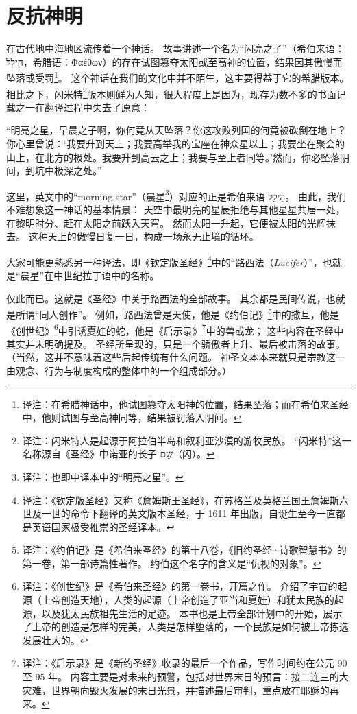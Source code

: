 \chapter{反抗神明}
在古代地中海地区流传着一个神话。
故事讲述一个名为“闪亮之子”（希伯来语：\texthebrew{הֵילֵל}，希腊语：\textgreek{Φαέθων}）的存在试图篡夺太阳或至高神的位置，结果因其傲慢而坠落或受罚\footnote{%
    译注：在希腊神话中，他试图篡夺太阳神的位置，结果坠落；而在希伯来圣经中，他则试图与至高神同等，结果被罚落入阴间。
}。
这个神话在我们的文化中并不陌生，这主要得益于它的希腊版本。
相比之下，闪米特\footnote{%
    译注：闪米特人是起源于阿拉伯半岛和叙利亚沙漠的游牧民族。
    “闪米特”这一名称源自《圣经》中诺亚的长子 \texthebrew{שֵׁם}（闪）。
}版本则鲜为人知，很大程度上是因为，现存为数不多的书面记载之一在翻译过程中失去了原意：

“明亮之星，早晨之子啊，你何竟从天坠落？你这攻败列国的何竟被砍倒在地上？你心里曾说：‘我要升到天上；我要高举我的宝座在神众星以上；我要坐在聚会的山上，在北方的极处。我要升到高云之上；我要与至上者同等。’然而，你必坠落阴间，到坑中极深之处。”\cite{biblica2011new-international-version}

这里，英文中的“morning star”（晨星\footnote{%
    译注：也即中译本中的“明亮之星”。
}）对应的正是希伯来语 \texthebrew{הֵילֵל}。
由此，我们不难想象这一神话的基本情景：
天空中最明亮的星辰拒绝与其他星星共居一处，在黎明时分、赶在太阳之前跃入天穹。
然而太阳一升起，它便被太阳的光辉抹去。
这种天上的傲慢日复一日，构成一场永无止境的循环。

大家可能更熟悉另一种译法，即《钦定版圣经》\footnote{%
    译注：《钦定版圣经》又称《詹姆斯王圣经》，在苏格兰及英格兰国王詹姆斯六世及一世的命令下翻译的英文版本圣经，于 1611 年出版，自诞生至今一直都是英语国家极受推崇的圣经译本。
}中的“路西法（\textlatin{\emph{Lucifer}}）”，也就是“晨星”在中世纪拉丁语中的名称。

仅此而已。这就是《圣经》中关于路西法的全部故事。
其余都是民间传说，也就是所谓“同人创作”。
例如，路西法曾是天使，他是《约伯记》\footnote{%
    译注：《约伯记》是《希伯来圣经》的第十八卷，《旧约圣经·诗歌智慧书》的第一卷，第一部诗篇性著作。
    约伯这个名字的含义是“仇视的对象”。
}中的撒旦，他是《创世纪》\footnote{%
    译注：《创世纪》是《希伯来圣经》的第一卷书，开篇之作。
    介绍了宇宙的起源（上帝创造天地），人类的起源（上帝创造了亚当和夏娃）和犹太民族的起源，以及犹太民族祖先生活的足迹。
    本书也是上帝全部计划中的开始，展示了上帝的创造是怎样的完美，人类是怎样堕落的，一个民族是如何被上帝拣选发展壮大的。
}中引诱夏娃的蛇，他是《启示录》\footnote{%
    译注：《启示录》是《新约圣经》收录的最后一个作品，写作时间约在公元 90 至 95 年。
    内容主要是对未来的预警，包括对世界末日的预言：接二连三的大灾难，世界朝向毁灭发展的末日光景，并描述最后审判，重点放在耶稣的再来。
}中的兽或龙；
这些内容在圣经中其实并未明确提及。
圣经所呈现的，只是一个骄傲者上升、最后被击落的故事。
（当然，这并不意味着这些后起传统有什么问题。
神圣文本本来就只是宗教这一由观念、行为与制度构成的整体中的一个组成部分\cite{smart1998nature-religion}。）

